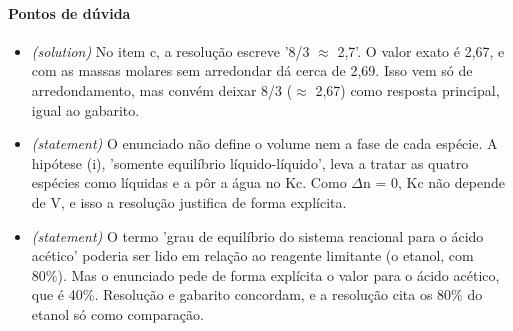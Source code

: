\documentclass{article}%
\begin{document}
\paragraph{Pontos de dúvida}%
\begin{itemize}%
\item%
\textit{(solution)} No item c, a resolução escreve '8/3 $\approx$ 2,7'. O valor exato é 2,67, e com as massas molares sem arredondar dá cerca de 2,69. Isso vem só de arredondamento, mas convém deixar 8/3 ($\approx$ 2,67) como resposta principal, igual ao gabarito.%
\item%
\textit{(statement)} O enunciado não define o volume nem a fase de cada espécie. A hipótese (i), 'somente equilíbrio líquido{-}líquido', leva a tratar as quatro espécies como líquidas e a pôr a água no Kc. Como $\Delta$n = 0, Kc não depende de V, e isso a resolução justifica de forma explícita.%
\item%
\textit{(statement)} O termo 'grau de equilíbrio do sistema reacional para o ácido acético' poderia ser lido em relação ao reagente limitante (o etanol, com 80\%). Mas o enunciado pede de forma explícita o valor para o ácido acético, que é 40\%. Resolução e gabarito concordam, e a resolução cita os 80\% do etanol só como comparação.%
\end{itemize}%
\end{document}
